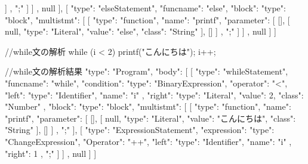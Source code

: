 {{{{                        ]
                     },
                     ";"
                  ]
               ]
            }
         },
         null
      ],
      [
         {
            "type": "elseStatement",
            "funcname": "else",
            "block": {
               "type": "block",
               "multistmt": [
                  [
                     {
                        "type": "function",
                        "name": "printf",
                        "parameter": [
                           [],
                           [
                              null,
                              {
                                 "type": "Literal",
                                 "value": "else",
                                 "class": "String"
                              }
                           ],
                           []
                        ]
                     },
                     ";"
                  ]
               ]
            }
         },
         null
      ]
   ]
}

//while文の解析
while (i < 2){
  printf("こんにちは\n");
  i++;
}

//while文の解析結果
{
   "type": "Program",
   "body": [
      [
         {
            "type": "whileStatement",
            "funcname": "while",
            "condition": {
               "type": "BinaryExpression",
               "operator": "<",
               "left": {
                  "type": "Identifier",
                  "name": "i"
               },
               "right": {
                  "type": "Literal",
                  "value": 2,
                  "class": "Number"
               }
            },
            "block": {
               "type": "block",
               "multistmt": [
                  [
                     {
                        "type": "function",
                        "name": "printf",
                        "parameter": [
                           [],
                           [
                              null,
                              {
                                 "type": "Literal",
                                 "value": "こんにちは\n",
                                 "class": "String"
                              }
                           ],
                           []
                        ]
                     },
                     ";"
                  ],
                  [
                     {
                        "type": "ExpressionStatement",
                        "expression": {
                           "type": "ChangeExpression",
                           "Operator": "++",
                           "left": {
                              "type": "Identifier",
                              "name": "i"
                           },
                           "right": 1
                        }
                     },
                     ";"
                  ]
               ]
            }
         },
         null
      ]
   ]
}

